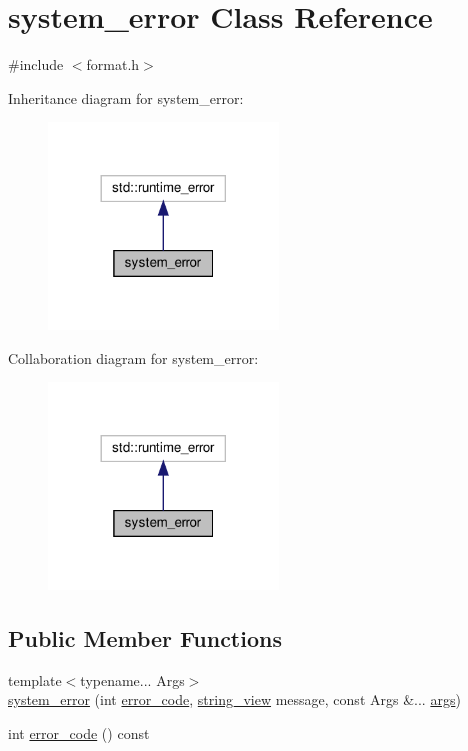 \hypertarget{classsystem__error}{}\section{system\+\_\+error Class Reference}
\label{classsystem__error}


{\ttfamily \#include $<$format.\+h$>$}



Inheritance diagram for system\+\_\+error\+:
\nopagebreak
\begin{figure}[H]
\begin{center}
\leavevmode
\includegraphics[width=173pt]{classsystem__error__inherit__graph}
\end{center}
\end{figure}


Collaboration diagram for system\+\_\+error\+:
\nopagebreak
\begin{figure}[H]
\begin{center}
\leavevmode
\includegraphics[width=173pt]{classsystem__error__coll__graph}
\end{center}
\end{figure}
\subsection*{Public Member Functions}
\begin{DoxyCompactItemize}
\item 
{\footnotesize template$<$typename... Args$>$ }\\\hyperlink{classsystem__error_a6761fd4c8604a59a7c79f6bfdfaf25cb}{system\+\_\+error} (int \hyperlink{classerror__code}{error\+\_\+code}, \hyperlink{core_8h_a17e3ff7f9ac2b8f068f719b829890036}{string\+\_\+view} message, const Args \&... \hyperlink{printf_8h_a47047b7b28fd1342eef756b79c778580}{args})
\item 
int \hyperlink{classsystem__error_a9c095f54f80c8393f6bf24eb9d188ec4}{error\+\_\+code} () const
\end{DoxyCompactItemize}
